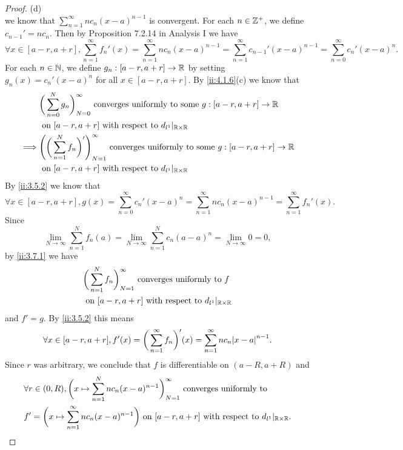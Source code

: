 \begin{proof}{(d)}
\[  \]
  we know that \(\sum_{n = 1}^\infty n c_n (x - a)^{n - 1}\) is convergent.
  For each \(n \in \mathbb{Z}^+\), we define \(c_{n - 1}' = n c_n\).
  Then by Proposition 7.2.14 in Analysis I we have
  \[
    \forall x \in [a - r, a + r], \sum_{n = 1}^\infty f_n'(x) = \sum_{n = 1}^\infty n c_n (x - a)^{n - 1} = \sum_{n = 1}^\infty c_{n - 1}' (x - a)^{n - 1} = \sum_{n = 0}^\infty c_n' (x - a)^n.
  \]
  For each \(n \in \mathbb{N}\), we define \(g_n : [a - r, a + r] \to \mathbb{R}\) by setting \(g_n(x) = c_n' (x - a)^n\) for all \(x \in [a - r, a + r]\).
  By \cref{ii:4.1.6}(c) we know that
  \begin{align*}
             & \bigg(\sum_{n = 0}^N g_n\bigg)_{N = 0}^\infty \text{ converges uniformly to some } g : [a - r, a + r] \to \mathbb{R}              \\
             & \text{ on } [a - r, a + r] \text{ with respect to } d_{l^1}|_{\mathbb{R} \times \mathbb{R}}                                               \\
    \implies & \Bigg(\bigg(\sum_{n = 1}^N f_n\bigg)'\Bigg)_{N = 1}^\infty \text{ converges uniformly to some } g : [a - r, a + r] \to \mathbb{R} \\
             & \text{ on } [a - r, a + r] \text{ with respect to } d_{l^1}|_{\mathbb{R} \times \mathbb{R}}
  \end{align*}
  By \cref{ii:3.5.2} we know that
  \[
    \forall x \in [a - r, a + r], g(x) = \sum_{n = 0}^\infty c_n' (x - a)^n = \sum_{n = 1}^\infty n c_n (x - a)^{n - 1} = \sum_{n = 1}^\infty f_n'(x).
  \]
  Since
  \[
    \lim_{N \to \infty} \sum_{n = 1}^N f_n(a) = \lim_{N \to \infty} \sum_{n = 1}^N c_n (a - a)^n = \lim_{N \to \infty} 0 = 0,
  \]
  by \cref{ii:3.7.1} we have
  \begin{align*}
     & \bigg(\sum_{n = 1}^N f_n\bigg)_{N = 1}^\infty \text{ converges uniformly to } f \\
     & \text{ on } [a - r, a + r] \text{ with respect to } d_{l^1}|_{\mathbb{R} \times \mathbb{R}}
  \end{align*}
  and \(f' = g\).
  By \cref{ii:3.5.2} this means
  \[
    \forall x \in [a - r, a + r], f'(x) = \bigg(\sum_{n = 1}^\infty f_n\bigg)'(x) = \sum_{n = 1}^\infty n c_n \abs{x - a}^{n - 1}.
  \]
  Since \(r\) was arbitrary, we conclude that \(f\) is differentiable on \((a - R, a + R)\) and
  \begin{align*}
     & \forall r \in (0, R), \bigg(x \mapsto \sum_{n = 1}^N n c_n (x - a)^{n - 1}\bigg)_{N = 1}^\infty \text{ converges uniformly to }                   \\
     & f' = \bigg(x \mapsto \sum_{n = 1}^\infty n c_n (x - a)^{n - 1}\bigg) \text{ on } [a - r, a + r] \text{ with respect to } d_{l^1}|_{\mathbb{R} \times \mathbb{R}}.
  \end{align*}
\end{proof}

